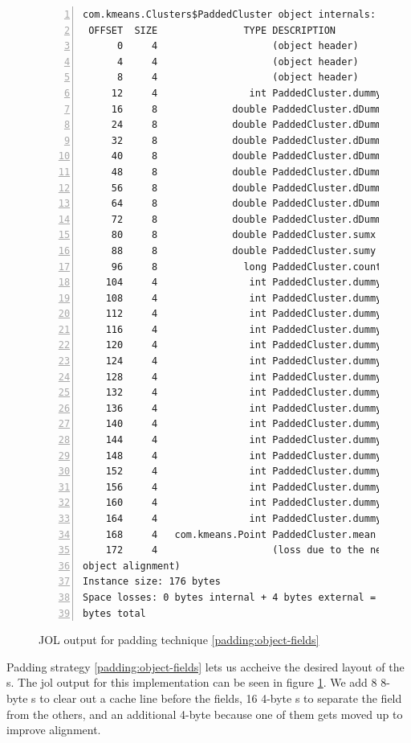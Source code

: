 \begin{figure}[h]
\begin{Verbatim}[frame=single, numbers=left]
com.kmeans.Clusters$PaddedCluster object internals:
 OFFSET  SIZE               TYPE DESCRIPTION
      0     4                    (object header)
      4     4                    (object header)
      8     4                    (object header)
     12     4                int PaddedCluster.dummy1
     16     8             double PaddedCluster.dDummy1
     24     8             double PaddedCluster.dDummy2
     32     8             double PaddedCluster.dDummy3
     40     8             double PaddedCluster.dDummy4
     48     8             double PaddedCluster.dDummy5
     56     8             double PaddedCluster.dDummy6
     64     8             double PaddedCluster.dDummy7
     72     8             double PaddedCluster.dDummy8
     80     8             double PaddedCluster.sumx
     88     8             double PaddedCluster.sumy
     96     8               long PaddedCluster.count
    104     4                int PaddedCluster.dummy2
    108     4                int PaddedCluster.dummy3
    112     4                int PaddedCluster.dummy4
    116     4                int PaddedCluster.dummy5
    120     4                int PaddedCluster.dummy6
    124     4                int PaddedCluster.dummy7
    128     4                int PaddedCluster.dummy8
    132     4                int PaddedCluster.dummy9
    136     4                int PaddedCluster.dummy10
    140     4                int PaddedCluster.dummy11
    144     4                int PaddedCluster.dummy12
    148     4                int PaddedCluster.dummy13
    152     4                int PaddedCluster.dummy14
    156     4                int PaddedCluster.dummy15
    160     4                int PaddedCluster.dummy16
    164     4                int PaddedCluster.dummy17
    168     4   com.kmeans.Point PaddedCluster.mean
    172     4                    (loss due to the next
object alignment)
Instance size: 176 bytes
Space losses: 0 bytes internal + 4 bytes external = 4
bytes total
\end{Verbatim}
	\caption{JOL output for padding technique \ref{padding:object-fields}}
	\label{jol:paddedcluster}
\end{figure}

Padding strategy \ref{padding:object-fields} lets us accheive the desired
layout of the s. The jol output for this implementation can be
seen in figure \ref{jol:paddedcluster}. We add 8 8-byte s to clear
out a cache line before the fields, 16 4-byte s to separate the
 field from the others, and an additional 4-byte  because
one of them gets moved up to improve alignment.

